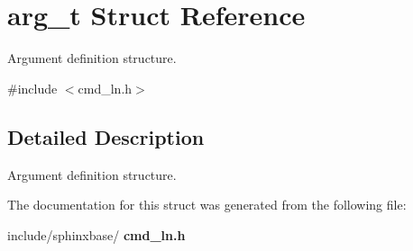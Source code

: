\section{arg\+\_\+t Struct Reference}
\label{structarg__t}


Argument definition structure.  




{\ttfamily \#include $<$cmd\+\_\+ln.\+h$>$}



\subsection{Detailed Description}
Argument definition structure. 

The documentation for this struct was generated from the following file\+:\begin{DoxyCompactItemize}
\item 
include/sphinxbase/\textbf{ cmd\+\_\+ln.\+h}\end{DoxyCompactItemize}
